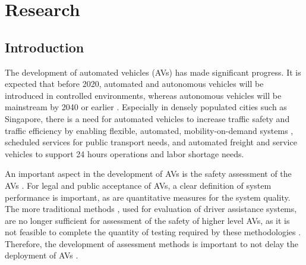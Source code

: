 \section{Research}
\label{sec:research}


\subsection{Introduction}
\label{sec:introduction}

The development of automated vehicles (AVs) has made significant progress. It is expected that before 2020, automated and autonomous vehicles will be introduced in controlled environments, whereas autonomous vehicles will be mainstream by 2040 \cite{madni2018autonomous} or earlier \cite{bimbraw2015autonomous}. Especially in densely populated cities such as Singapore, there is a need for automated vehicles to increase traffic safety and traffic efficiency by enabling flexible, automated, mobility-on-demand systems \cite{spieser2014toward}, scheduled services for public transport needs, and automated freight and service vehicles to support 24 hours operations and labor shortage needs.

An important aspect in the development of AVs is the safety assessment of the AVs \cite{bengler2014threedecades, stellet2015taxonomy, putz2017pegasus, wachenfeld2016release}. For legal and public acceptance of AVs, a clear definition of system performance is important, as are quantitative measures for the system quality. The more traditional methods \cite{ISO26262, response2006code}, used for evaluation of driver assistance systems, are no longer sufficient for assessment of the safety of higher level AVs, as it is not feasible to complete the quantity of testing required by these methodologies \cite{wachenfeld2016release}. Therefore, the development of assessment methods is important to not delay the deployment of AVs \cite{bengler2014threedecades}.

